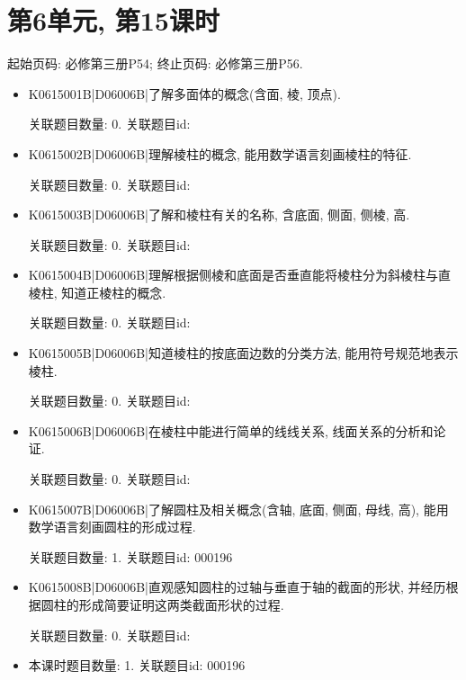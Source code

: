 \section*{第6单元, 第15课时}
起始页码: 必修第三册P54; 终止页码: 必修第三册P56.
\begin{itemize}
\item K0615001B|D06006B|了解多面体的概念(含面, 棱, 顶点).

关联题目数量: 0. 关联题目id: 

\item K0615002B|D06006B|理解棱柱的概念, 能用数学语言刻画棱柱的特征.

关联题目数量: 0. 关联题目id: 

\item K0615003B|D06006B|了解和棱柱有关的名称, 含底面, 侧面, 侧棱, 高.

关联题目数量: 0. 关联题目id: 

\item K0615004B|D06006B|理解根据侧棱和底面是否垂直能将棱柱分为斜棱柱与直棱柱, 知道正棱柱的概念.

关联题目数量: 0. 关联题目id: 

\item K0615005B|D06006B|知道棱柱的按底面边数的分类方法, 能用符号规范地表示棱柱.

关联题目数量: 0. 关联题目id: 

\item K0615006B|D06006B|在棱柱中能进行简单的线线关系, 线面关系的分析和论证.

关联题目数量: 0. 关联题目id: 

\item K0615007B|D06006B|了解圆柱及相关概念(含轴, 底面, 侧面, 母线, 高), 能用数学语言刻画圆柱的形成过程.

关联题目数量: 1. 关联题目id: 000196

\item K0615008B|D06006B|直观感知圆柱的过轴与垂直于轴的截面的形状, 并经历根据圆柱的形成简要证明这两类截面形状的过程.

关联题目数量: 0. 关联题目id: 

\item 本课时题目数量: 1. 关联题目id: 000196

\end{itemize}


